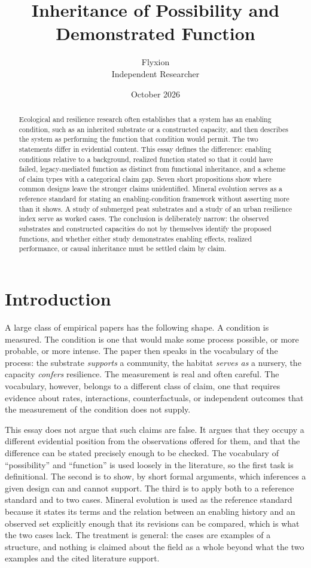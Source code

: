 \documentclass[11pt]{article}
\title{Inheritance of Possibility and Demonstrated Function}
\author{Flyxion\\Independent Researcher}
\date{October 2026}
\theoremstyle{definition}
\theoremstyle{remark}
\begin{document}
\maketitle

\begin{abstract}
Ecological and resilience research often establishes that a system has an enabling condition, such as an inherited substrate or a constructed capacity, and then describes the system as performing the function that condition would permit. The two statements differ in evidential content. This essay defines the difference: enabling conditions relative to a background, realized function stated so that it could have failed, legacy-mediated function as distinct from functional inheritance, and a scheme of claim types with a categorical claim gap. Seven short propositions show where common designs leave the stronger claims unidentified. Mineral evolution serves as a reference standard for stating an enabling-condition framework without asserting more than it shows. A study of submerged peat substrates and a study of an urban resilience index serve as worked cases. The conclusion is deliberately narrow: the observed substrates and constructed capacities do not by themselves identify the proposed functions, and whether either study demonstrates enabling effects, realized performance, or causal inheritance must be settled claim by claim.
\end{abstract}

\section{Introduction}

A large class of empirical papers has the following shape. A condition is measured. The condition is one that would make some process possible, or more probable, or more intense. The paper then speaks in the vocabulary of the process: the substrate \emph{supports} a community, the habitat \emph{serves as} a nursery, the capacity \emph{confers} resilience. The measurement is real and often careful. The vocabulary, however, belongs to a different class of claim, one that requires evidence about rates, interactions, counterfactuals, or independent outcomes that the measurement of the condition does not supply.

This essay does not argue that such claims are false. It argues that they occupy a different evidential position from the observations offered for them, and that the difference can be stated precisely enough to be checked. The vocabulary of ``possibility'' and ``function'' is used loosely in the literature, so the first task is definitional. The second is to show, by short formal arguments, which inferences a given design can and cannot support. The third is to apply both to a reference standard and to two cases. Mineral evolution is used as the reference standard because it states its terms and the relation between an enabling history and an observed set explicitly enough that its revisions can be compared, which is what the two cases lack. The treatment is general: the cases are examples of a structure, and nothing is claimed about the field as a whole beyond what the two examples and the cited literature support.
\end{document}

